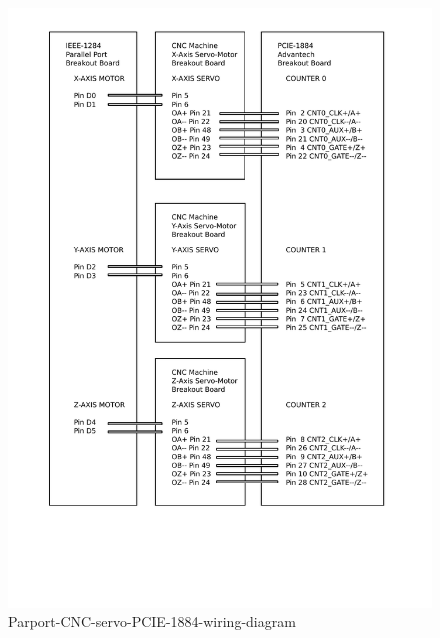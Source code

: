 \begin{figure}
	\caption{Parport-CNC-servo-PCIE-1884-wiring-diagram}
	\label{Parport-CNC-servo-PCIE-1884-wiring-diagram.pdf}
	\includegraphics[width=1.00\textwidth]{Chap3/work-setup/Parport-CNC-servo-PCIE-1884-wiring-diagram.pdf} 
\end{figure}

